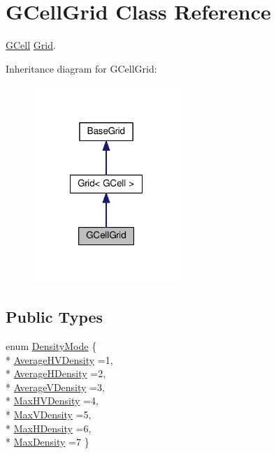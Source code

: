 \hypertarget{classKatabatic_1_1GCellGrid}{\section{G\-Cell\-Grid Class Reference}
\label{classKatabatic_1_1GCellGrid}
}


\hyperlink{classKatabatic_1_1GCell}{G\-Cell} \hyperlink{classKatabatic_1_1Grid}{Grid}.  




Inheritance diagram for G\-Cell\-Grid\-:\nopagebreak
\begin{figure}[H]
\begin{center}
\leavevmode
\includegraphics[width=156pt]{classKatabatic_1_1GCellGrid__inherit__graph}
\end{center}
\end{figure}
\subsection*{Public Types}
\begin{DoxyCompactItemize}
\item 
enum \hyperlink{classKatabatic_1_1GCellGrid_a07884f5e1af410e98208fed76a2b40fe}{Density\-Mode} \{ \\*
\hyperlink{classKatabatic_1_1GCellGrid_a07884f5e1af410e98208fed76a2b40fead15bf3e5b63f398d76d717a088acd310}{Average\-H\-V\-Density} =1, 
\\*
\hyperlink{classKatabatic_1_1GCellGrid_a07884f5e1af410e98208fed76a2b40feaec0ad06385eae8d1e2dee4f3c9f9f4ed}{Average\-H\-Density} =2, 
\\*
\hyperlink{classKatabatic_1_1GCellGrid_a07884f5e1af410e98208fed76a2b40fead1a1d89017d10aeb63d1c05b6fb650dd}{Average\-V\-Density} =3, 
\\*
\hyperlink{classKatabatic_1_1GCellGrid_a07884f5e1af410e98208fed76a2b40fea8265e053af0708a508ecbce86d1a8165}{Max\-H\-V\-Density} =4, 
\\*
\hyperlink{classKatabatic_1_1GCellGrid_a07884f5e1af410e98208fed76a2b40fea5f0a89ca367ef98550eaa86c1e32c873}{Max\-V\-Density} =5, 
\\*
\hyperlink{classKatabatic_1_1GCellGrid_a07884f5e1af410e98208fed76a2b40fea2a6d29b012cc89026c3c0061f87a4f03}{Max\-H\-Density} =6, 
\\*
\hyperlink{classKatabatic_1_1GCellGrid_a07884f5e1af410e98208fed76a2b40fea90a2f4a4ee8558de9f99458ddeab852c}{Max\-Density} =7
 \}
\end{DoxyCompactItemize}
